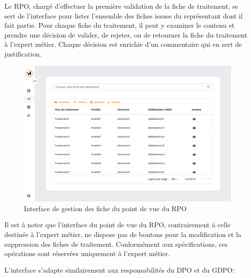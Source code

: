 \clearpage
 
\noindent 
Le RPO, chargé d'effectuer la première validation de la fiche de traitement, se sert de l'interface pour lister l'ensemble des fiches issues du représentant dont il fait partie. Pour chaque fiche du traitement, il peut y examiner le contenu et prendre une décision de valider, de rejeter, ou de retourner la fiche du traitement à l'expert métier. Chaque décision est enrichie d'un commentaire qui en sert de justification. \\

\begin{figure}[H]
    \centering
    \includegraphics[width=\textwidth]{images/guis/fiches/fiches-rpo.png}
    \caption{Interface de gestion des fiche du point de vue du RPO}
\end{figure}

\vspace{.3cm}

\noindent Il est à noter que l'interface du point de vue du RPO, contrairement à celle destinée à l'expert métier, ne dispose pas de boutons pour la modification et la suppression des fiches de traitement. Conformément aux spécifications, ces opérations sont réservées uniquement à l'expert métier.  

\clearpage

\noindent L'interface s'adapte similairement aux responsabilités du DPO et du GDPO:

